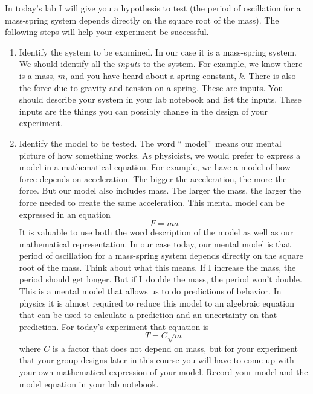 \documentclass{book}
\begin{document}
In today's lab I will give you a hypothesis to test (the period of oscillation
for a mass-spring system depends directly on the square root of the mass). The
following steps will help your experiment be successful.

\begin{enumerate}
\item Identify the system to be examined. In our case it is a mass-spring
system. We should identify all the \emph{inputs} to the system. For example,
we know there is a mass, $m$, and you have heard about a spring constant, $k.
$ There is also the force due to gravity and tension on a spring. These are
inputs. You should describe your system in your lab notebook and list the
inputs. These inputs are the things you can possibly change in the design of
your experiment.

\item Identify the model to be tested. The word \textquotedblleft
model\textquotedblright\ means our mental picture of how something works. As
physicists, we would prefer to express a model in a mathematical equation. For
example, we have a model of how force depends on acceleration. The bigger the
acceleration, the more the force. But our model also includes mass. The larger
the mass, the larger the force needed to create the same acceleration. This
mental model can be expressed in an equation
\[
F=ma
\]
It is valuable to use both the word description of the model as well as our
mathematical representation. In our case today, our mental model is that
period of oscillation for a mass-spring system depends directly on the square
root of the mass. Think about what this means. If I increase the mass, the
period should get longer. But if I\ double the mass, the period won't double.
This is a mental model that allows us to do predictions of behavior. In
physics it is almost required to reduce this model to an algebraic equation
that can be used to calculate a prediction and an uncertainty on that
prediction. For today's experiment that equation is
\[
T=C\sqrt{m}
\]
where $C$ is a factor that does not depend on mass, but for your experiment
that your group designs later in this course you will have to come up with
your own mathematical expression of your model. Record your model and the
model equation in your lab notebook.


\end{enumerate}
\end{document}
